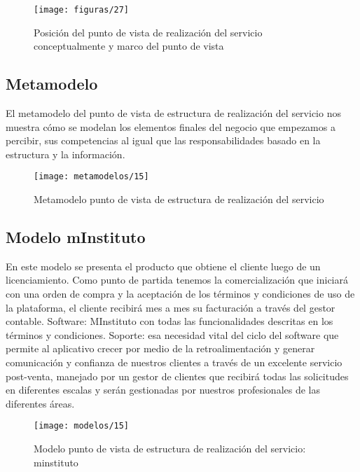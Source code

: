     \begin{figure}[H]
    	\centering
    	\texttt{[image: figuras/27]}
    	\captionsetup{width=.95\textwidth}
    	\caption{Posición del punto de vista de realización del servicio conceptualmente y marco del punto de vista}
    	\label{figura27}
    \end{figure}
    
    \subsection{Metamodelo}
    El metamodelo del punto de vista de estructura de realización del servicio nos muestra cómo se modelan los elementos finales del negocio que empezamos a percibir, sus competencias al igual que las responsabilidades basado en la estructura y la información.
    
    \begin{figure}[H]
    	\centering
    	\texttt{[image: metamodelos/15]}
    	\captionsetup{width=.95\textwidth}
    	\caption{Metamodelo punto de vista de estructura de realización del servicio}
    	\label{metamodelo15}
    \end{figure}
    
    \subsection{Modelo mInstituto}
    En este modelo se presenta el producto que obtiene el cliente luego de un licenciamiento. Como punto de partida tenemos la comercialización que iniciará con una orden de compra y la aceptación de los términos y condiciones de uso de la plataforma, el cliente recibirá mes a mes su facturación a través del gestor contable. Software: MInstituto con todas las funcionalidades descritas en los términos y condiciones. Soporte: esa necesidad vital del ciclo del software que permite al aplicativo crecer por medio de la retroalimentación y generar comunicación y confianza de nuestros clientes a través de un excelente servicio post-venta, manejado por un gestor de clientes que recibirá todas las solicitudes en diferentes escalas y serán gestionadas por nuestros profesionales de las diferentes áreas.
    
    \begin{figure}[H]
    	\centering
    	\texttt{[image: modelos/15]}
    	\captionsetup{width=.95\textwidth}
    	\caption{Modelo punto de vista de estructura de realización del servicio: minstituto}
    	\label{modelo15}
    \end{figure}

